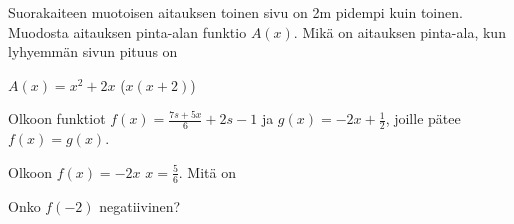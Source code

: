 \begin{tehtavasivu}
\begin{tehtava}
\end{tehtava}

\begin{tehtava}
  Suorakaiteen muotoisen aitauksen toinen sivu on 2m pidempi kuin toinen.
  Muodosta aitauksen pinta-alan funktio $A(x)$.
  Mikä on aitauksen pinta-ala, kun lyhyemmän sivun pituus on
  \begin{alakohdat}
  \end{alakohdat}

  \begin{vastaus}
    $A(x) = x^2 + 2x$ ($x(x+2)$)
      \begin{alakohdat}
      \end{alakohdat}
  \end{vastaus}
\end{tehtava}

\begin{tehtava}
  Olkoon funktiot $f(x) = \frac{7s + 5x}{6} + 2s - 1$ ja $g(x) = -2x + \frac{1}{2}$, joille pätee $f(x) = g(x)$.
  \begin{alakohdat}
  \end{alakohdat}

  \begin{vastaus}
      \begin{alakohdat}
      \end{alakohdat}
  \end{vastaus}
\end{tehtava}

\begin{tehtava} %
	Olkoon $f(x)=-2x$ $x=\frac{5}{6}$. Mitä on
	\begin{alakohdat}
	 \end{alakohdat}
	 Onko $f(-2)$ negatiivinen?
\end{tehtava}


\end{tehtavasivu}
